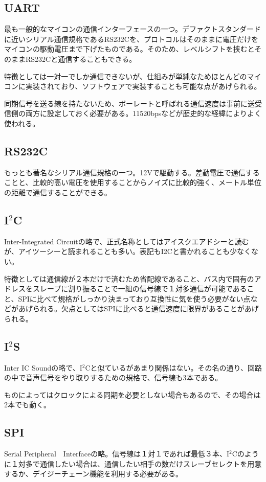 \documentclass[a4paper,titlepage,here]{ujarticle}
\begin{document}
\subsection{UART}
最も一般的なマイコンの通信インターフェースの一つ。デファクトスタンダードに近いシリアル通信規格であるRS232Cを、プロトコルはそのままに電圧だけをマイコンの駆動電圧まで下げたものである。そのため、レベルシフトを挟むとそのままRS232Cと通信することもできる。

特徴としては一対一でしか通信できないが、仕組みが単純なためほとんどのマイコンに実装されており、ソフトウェアで実装することも可能な点があげられる。

同期信号を送る線を持たないため、ボーレートと呼ばれる通信速度は事前に送受信側の両方に設定しておく必要がある。11520bpsなどが歴史的な経緯によりよく使われる。
\subsection{RS232C}
もっとも著名なシリアル通信規格の一つ。12Vで駆動する。差動電圧で通信することと、比較的高い電圧を使用することからノイズに比較的強く、メートル単位の距離で通信することができる。
\subsection{I$^2$C}
Inter-Integrated Circuitの略で、正式名称としてはアイスクエアドシーと読むが、アイツーシーと読まれることも多い。表記もI2Cと書かれることも少なくない。

特徴としては通信線が２本だけで済むため省配線であること、バス内で固有のアドレスをスレーブに割り振ることで一組の信号線で１対多通信が可能であること、SPIに比べて規格がしっかり決まっており互換性に気を使う必要がない点などがあげられる。欠点としてはSPIに比べると通信速度に限界があることがあげられる。
\subsection{I$^2$S}
Inter IC Soundの略で、I$^2$Cと似ているがあまり関係はない。その名の通り、回路の中で音声信号をやり取りするための規格で、信号線も3本である。

ものによってはクロックによる同期を必要としない場合もあるので、その場合は2本でも動く。
\subsection{SPI}
Serial Peripheral　Interfaceの略。信号線は１対１であれば最低３本、I$^2$Cのように１対多で通信したい場合は、通信したい相手の数だけスレーブセレクトを用意するか、デイジーチェーン機能を利用する必要がある。
\end{document}

